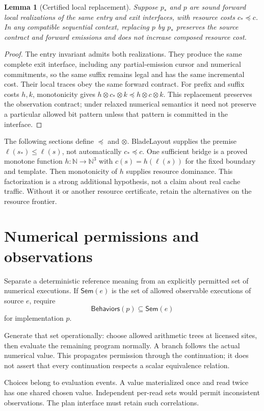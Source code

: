 \documentclass[11pt]{article}
\newtheorem{lemma}[theorem]{Lemma}
\newcommand{\Sem}{\mathsf{Sem}}
\newcommand{\Nat}{\mathbb N}
\begin{document}
\begin{lemma}[Certified local replacement]
Suppose $p_*$ and $p$ are sound forward local realizations of the same entry and exit interfaces, with resource costs $c_*\preceq c$. In any compatible sequential context, replacing $p$ by $p_*$ preserves the source contract and forward emissions and does not increase composed resource cost.
\end{lemma}
\begin{proof}
The entry invariant admits both realizations. They produce the same complete exit interface, including any partial-emission cursor and numerical commitments, so the same suffix remains legal and has the same incremental cost. Their local traces obey the same forward contract. For prefix and suffix costs $h,k$, monotonicity gives
$h\otimes c_*\otimes k\preceq h\otimes c\otimes k$.
This replacement preserves the observation contract; under relaxed numerical semantics it need not preserve a particular allowed bit pattern unless that pattern is committed in the interface.
\end{proof}
The following sections define $\preceq$ and $\otimes$. BladeLayout supplies the premise $\ell(s_*)\le\ell(s)$, not automatically $c_*\preceq c$. One sufficient bridge is a proved monotone function $h:\Nat\to\Nat^3$ with $c(s)=h(\ell(s))$ for the fixed boundary and template. Then monotonicity of $h$ supplies resource dominance. This factorization is a strong additional hypothesis, not a claim about real cache traffic. Without it or another resource certificate, retain the alternatives on the resource frontier.

\section{Numerical permissions and observations}
Separate a deterministic reference meaning from an explicitly permitted set of numerical executions. If $\Sem(e)$ is the set of allowed observable executions of source $e$, require
\[
 \mathsf{Behaviors}(p)\subseteq\Sem(e)
\]
for implementation $p$.

Generate that set operationally: choose allowed arithmetic trees at licensed sites, then evaluate the remaining program normally. A branch follows the actual numerical value. This propagates permission through the continuation; it does not assert that every continuation respects a scalar equivalence relation.

Choices belong to evaluation events. A value materialized once and read twice has one shared chosen value. Independent per-read sets would permit inconsistent observations. The plan interface must retain such correlations.
\end{document}
